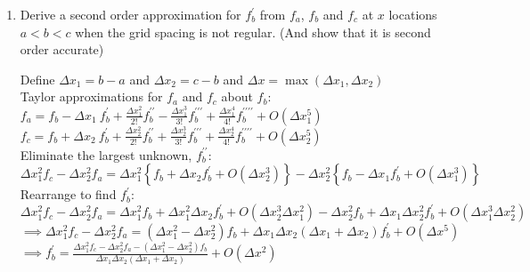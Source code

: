 {\begin{enumerate}
Taylor approximations for $f_{j+1}$ and $f_{j+2}$ about $f_{j}$:\\
$f_{j+1}=f_{j}+\Delta xf_{j}^{\prime}+\frac{\Delta x^{2}}{2!}f_{j}^{\prime\prime}+\frac{\Delta x^{3}}{3!}f_{j}^{\prime\prime\prime}+\frac{\Delta x^{4}}{4!}f_{j}^{\prime\prime\prime\prime}+O(\Delta x^{5})$\\
$f_{j+2}=f_{j}+2\Delta xf_{j}^{\prime}+2\Delta x^{2}f_{j}^{\prime\prime}+\frac{4\Delta x^{3}}{3}f_{j}^{\prime\prime\prime}+\frac{2\Delta x^{4}}{3}f_{j}^{\prime\prime\prime\prime}+O(\Delta x^{5})$\\
Eliminate the largest unknown, $f_{j}^{\prime}$ by calculating $f_{j+2}-2f_{j+1}$:\\
$f_{j+2}-2f_{j+1}=-f_{j}-\Delta x^{2}\ f_{j}^{\prime\prime}+O(\Delta x^{3})$\\
Rearrange to find $f_{j}^{\prime\prime}$:\\
$f_{j}^{\prime\prime}=\left(-f_{j+2}+2f_{j+1}-f_{j}\right)/\Delta x^{2}+O(\Delta x)$

\item Derive a second order approximation for $f_{b}^{\prime}$ from $f_{a}$,
$f_{b}$ and $f_{c}$ at $x$ locations $a<b<c$ when the grid spacing
is not regular. (And show that it is second order accurate)


Define $\Delta x_{1}=b-a$ and $\Delta x_{2}=c-b$ and $\Delta x=\max\left(\Delta x_{1},\Delta x_{2}\right)$\\
Taylor approximations for $f_{a}$ and $f_{c}$ about $f_{b}$:\\
$f_{a}=f_{b}-\Delta x_{1}\ f_{b}^{\prime}+\frac{\Delta x_{1}^{2}}{2!}f_{b}^{\prime\prime}-\frac{\Delta x_{1}^{3}}{3!}f_{b}^{\prime\prime\prime}+\frac{\Delta x_{1}^{4}}{4!}f_{b}^{\prime\prime\prime\prime}+O(\Delta x_{1}^{5})$
\\
$f_{c}=f_{b}+\Delta x_{2}\ f_{b}^{\prime}+\frac{\Delta x_{2}^{2}}{2!}f_{b}^{\prime\prime}+\frac{\Delta x_{2}^{3}}{3!}f_{b}^{\prime\prime\prime}+\frac{\Delta x_{2}^{4}}{4!}f_{b}^{\prime\prime\prime\prime}+O(\Delta x_{2}^{5})$\\
Eliminate the largest unknown, $f_{b}^{\prime\prime}$:\\
$\Delta x_{1}^{2}f_{c}-\Delta x_{2}^{2}f_{a}=\Delta x_{1}^{2}\left\{ f_{b}+\Delta x_{2}f_{b}^{\prime}+O(\Delta x_{2}^{3})\right\} -\Delta x_{2}^{2}\left\{ f_{b}-\Delta x_{1}f_{b}^{\prime}+O(\Delta x_{1}^{3})\right\} $\\
Rearrange to find $f_{b}^{\prime}$:\\
$\Delta x_{1}^{2}f_{c}-\Delta x_{2}^{2}f_{a}=\Delta x_{1}^{2}f_{b}+\Delta x_{1}^{2}\Delta x_{2}f_{b}^{\prime}+O(\Delta x_{2}^{3}\Delta x_{1}^{2})-\Delta x_{2}^{2}f_{b}+\Delta x_{1}\Delta x_{2}^{2}f_{b}^{\prime}+O(\Delta x_{1}^{3}\Delta x_{2}^{2})$\\
$\implies\Delta x_{1}^{2}f_{c}-\Delta x_{2}^{2}f_{a}=\left(\Delta x_{1}^{2}-\Delta x_{2}^{2}\right)f_{b}+\Delta x_{1}\Delta x_{2}\left(\Delta x_{1}+\Delta x_{2}\right)f_{b}^{\prime}+O(\Delta x^{5})$\\
$\implies f_{b}^{\prime}=\frac{\Delta x_{1}^{2}f_{c}-\Delta x_{2}^{2}f_{a}-\left(\Delta x_{1}^{2}-\Delta x_{2}^{2}\right)f_{b}}{\Delta x_{1}\Delta x_{2}\left(\Delta x_{1}+\Delta x_{2}\right)}+O(\Delta x^{2})$


\end{enumerate}}
